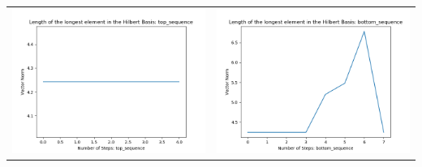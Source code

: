 \documentclass[10pt]{article}
\begin{document}
\begin{tabular}{c|c}
\begin{minipage}{.45\textwidth}
\includegraphics[width=\textwidth]{"DATA/4d/4 generators 2 bound H/top_sequence LENGTH"}
\end{minipage} &
\begin{minipage}{.45\textwidth}
\includegraphics[width=\textwidth]{"DATA/4d/4 generators 2 bound H bottomup/bottom_sequence LENGTH"}
\end{minipage}
\end{tabular}
\end{document}
